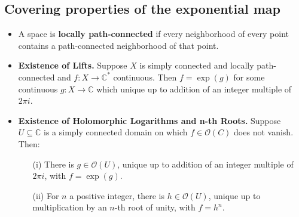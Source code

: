 \documentclass{article}
\newenvironment{topic}[1]{%
{\subsection{#1}}%
\begin{itemize}%
}{%
\end{itemize}%
}
\newcommand{\theorem}[1]{\item {\bf #1.}}
\newcommand{\corollary}[1]{\item {\bf #1.}}
\newcommand{\term}[1]{{\bf #1}}
\newcommand{\holo}[1]{\mathcal{O}(#1)}
\newcommand{\remark}{\item}
\begin{document}
\begin{topic}{Covering properties of the exponential map}
\remark A space is \term{locally path-connected} if every neighborhood of every point contains a path-connected neighborhood of that point.

\theorem{Existence of Lifts} Suppose $X$ is simply connected and locally path-connected and $f : X \to \mathbb{C}^\ast$ continuous. Then $f = \exp(g)$ for some continuous $g : X \to \mathbb{C}$ which unique up to addition of an integer multiple of $2 \pi i$.

\corollary{Existence of Holomorphic Logarithms and n-th Roots} Suppose $U \subseteq \mathbb{C}$ is a simply connected domain on which $f \in \holo{C}$ does not vanish. Then:
\begin{enumerate}
\item[(i)] There is $g \in \holo{U}$, unique up to addition of an integer multiple of $2 \pi i$, with $f = \exp(g)$.
\item[(ii)] For $n$ a positive integer, there is $h \in \holo{U}$, unique up to multiplication by an $n$-th root of unity, with $f = h^n$.
\end{enumerate}

\end{topic}
\end{document}
